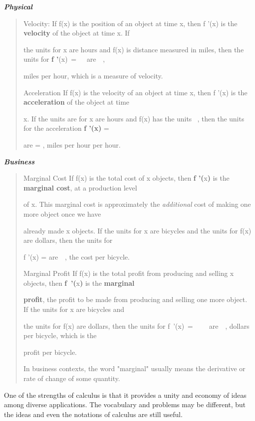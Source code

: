 \textbf{\emph{Physical}}

\begin{quote}
Velocity: If f(x) is the position of an object at time x, then f '(x) is
the \textbf{velocity} of the object at time x. If

the units for x are hours and f(x) is distance measured in miles, then
the units for \textbf{f '}(x)~=~~~are~~,

miles per hour, which is a measure of velocity.

Acceleration If f(x) is the velocity of an object at time x, then f '(x)
is the \textbf{acceleration} of the object at time

x. If the units are for x are hours and f(x) has the units ~, then the
units for the acceleration \textbf{f '(x)} =

are = , miles per hour per hour.
\end{quote}

\textbf{\emph{Business}}

\begin{quote}
Marginal Cost If f(x) is the total cost of x objects, then \textbf{f
'(}x\textbf{)} is the \textbf{marginal cost}, at a production level

of x. This marginal cost is approximately the \emph{additional} cost of
making one more object once we have

already made x objects. If the units for x are bicycles and the units
for f(x) are dollars, then the units for

f '(x) = are~~, the cost per bicycle.

Marginal Profit If f(x) is the total profit from producing and selling x
objects, then \textbf{f~'(}x\textbf{)} is the \textbf{marginal }

\textbf{profit}, the profit to be made from producing and selling one
more object. If the units for x are bicycles and

the units for f(x) are dollars, then the units for f~'(x)~=~~~~ are~~,
dollars per bicycle, which is the

profit per bicycle.

In business contexts, the word "marginal" usually means the derivative
or rate of change of some quantity.
\end{quote}

One of the strengths of calculus is that it provides a unity and economy
of ideas among diverse applications. The vocabulary and problems may be
different, but the ideas and even the notations of calculus are still
useful.


